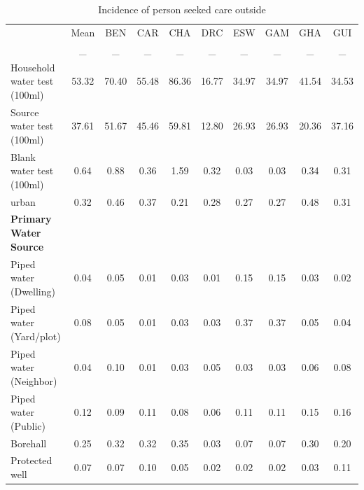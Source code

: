 \begin{table}[htbp]\centering
\def\sym#1{\ifmmode^{#1}\else\(^{#1}\)\fi}
\caption{Incidence of person seeked care outside \label{Outside}}
\begin{tabular}{l*{9}{c}}
\hline\hline
                    &\multicolumn{1}{c}{Mean}&\multicolumn{1}{c}{BEN}&\multicolumn{1}{c}{CAR}&\multicolumn{1}{c}{CHA}&\multicolumn{1}{c}{DRC}&\multicolumn{1}{c}{ESW}&\multicolumn{1}{c}{GAM}&\multicolumn{1}{c}{GHA}&\multicolumn{1}{c}{GUI}\\
                    &           _&           _&           _&           _&           _&           _&           _&           _&           _\\
\hline
Household water test (100ml)&       53.32&       70.40&       55.48&       86.36&       16.77&       34.97&       34.97&       41.54&       34.53\\
Source water test (100ml)&       37.61&       51.67&       45.46&       59.81&       12.80&       26.93&       26.93&       20.36&       37.16\\
Blank water test (100ml)&        0.64&        0.88&        0.36&        1.59&        0.32&        0.03&        0.03&        0.34&        0.31\\
urban               &        0.32&        0.46&        0.37&        0.21&        0.28&        0.27&        0.27&        0.48&        0.31\\
\textbf{Primary Water Source} \\\hline Piped water (Dwelling)&        0.04&        0.05&        0.01&        0.03&        0.01&        0.15&        0.15&        0.03&        0.02\\
Piped water (Yard/plot)&        0.08&        0.05&        0.01&        0.03&        0.03&        0.37&        0.37&        0.05&        0.04\\
Piped water (Neighbor)&        0.04&        0.10&        0.01&        0.03&        0.05&        0.03&        0.03&        0.06&        0.08\\
Piped water (Public)&        0.12&        0.09&        0.11&        0.08&        0.06&        0.11&        0.11&        0.15&        0.16\\
Borehall            &        0.25&        0.32&        0.32&        0.35&        0.03&        0.07&        0.07&        0.30&        0.20\\
Protected well      &        0.07&        0.07&        0.10&        0.05&        0.02&        0.02&        0.02&        0.03&        0.11\\

\end{tabular}
\end{table}
